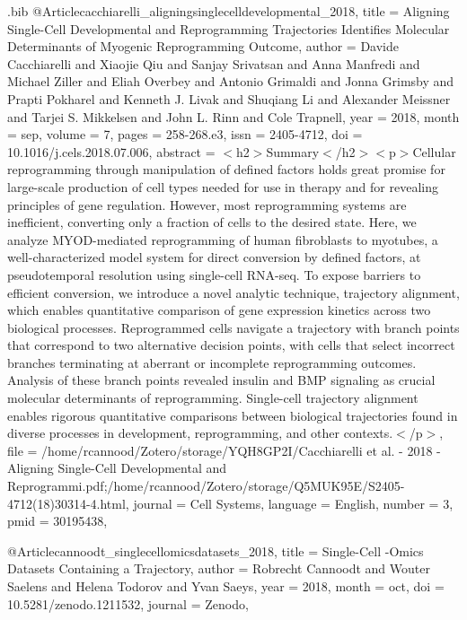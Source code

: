 \documentclass[
  table,
  10pt,
  a4paper]{article}
\begin{document}
\begin{filecontents}{\jobname.bib}
@Article{cacchiarelli_aligningsinglecelldevelopmental_2018,
	title = {Aligning {{Single}}-{{Cell Developmental}} and {{Reprogramming Trajectories Identifies Molecular Determinants}} of {{Myogenic Reprogramming Outcome}}},
	author = {Davide Cacchiarelli and Xiaojie Qiu and Sanjay Srivatsan and Anna Manfredi and Michael Ziller and Eliah Overbey and Antonio Grimaldi and Jonna Grimsby and Prapti Pokharel and Kenneth J. Livak and Shuqiang Li and Alexander Meissner and Tarjei S. Mikkelsen and John L. Rinn and Cole Trapnell},
	year = {2018},
	month = {sep},
	volume = {7},
	pages = {258-268.e3},
	issn = {2405-4712},
	doi = {10.1016/j.cels.2018.07.006},
	abstract = {{$<$}h2{$>$}Summary{$<$}/h2{$><$}p{$>$}Cellular reprogramming through manipulation of defined factors holds great promise for large-scale production of cell types needed for use in therapy and for revealing principles of gene regulation. However, most reprogramming systems are inefficient, converting only a fraction of cells to the desired state. Here, we analyze MYOD-mediated reprogramming of human fibroblasts to myotubes, a well-characterized model system for direct conversion by defined factors, at pseudotemporal resolution using single-cell RNA-seq. To expose barriers to efficient conversion, we introduce a novel analytic technique, trajectory alignment, which enables quantitative comparison of gene expression kinetics across two biological processes. Reprogrammed cells navigate a trajectory with branch points that correspond to two alternative decision points, with cells that select incorrect branches terminating at aberrant or incomplete reprogramming outcomes. Analysis of these branch points revealed insulin and BMP signaling as crucial molecular determinants of reprogramming. Single-cell trajectory alignment enables rigorous quantitative comparisons between biological trajectories found in diverse processes in development, reprogramming, and other contexts.{$<$}/p{$>$}},
	file = {/home/rcannood/Zotero/storage/YQH8GP2I/Cacchiarelli et al. - 2018 - Aligning Single-Cell Developmental and Reprogrammi.pdf;/home/rcannood/Zotero/storage/Q5MUK95E/S2405-4712(18)30314-4.html},
	journal = {Cell Systems},
	language = {English},
	number = {3},
	pmid = {30195438},
}

@Article{cannoodt_singlecellomicsdatasets_2018,
	title = {Single-Cell -Omics Datasets Containing a Trajectory},
	author = {Robrecht Cannoodt and Wouter Saelens and Helena Todorov and Yvan Saeys},
	year = {2018},
	month = {oct},
	doi = {10.5281/zenodo.1211532},
	journal = {Zenodo},
}


\end{filecontents}
\end{document}
